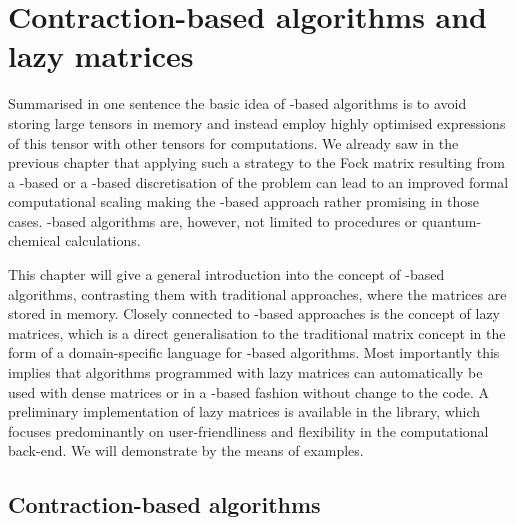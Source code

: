 \chapter{Contraction-based algorithms and lazy matrices}
\label{ch:LazyMatrices}
%
%

\noindent
Summarised in one sentence the basic idea of \contraction-based algorithms
is to avoid storing large tensors in memory
and instead employ highly optimised
\contraction expressions of this tensor with other tensors for computations.
We already saw in the previous chapter that applying
such a strategy to the Fock matrix resulting from a \FE-based
or a \CS-based discretisation of the \HF problem
can lead to an improved formal computational scaling
making the \contraction-based approach rather promising in those cases.
\contraction-based algorithms are, however,
not limited to \SCF procedures or quantum-chemical calculations.

This chapter will give a general introduction into
the concept of \contraction-based algorithms,
contrasting them with traditional approaches,
where the matrices are stored in memory.
Closely connected to \contraction-based approaches is the concept of lazy matrices,
which is a direct generalisation to the traditional matrix concept
in the form of a domain-specific language for \contraction-based algorithms.
Most importantly this implies that algorithms programmed
with lazy matrices can automatically
be used with dense matrices or in a \contraction-based fashion without change to the code.
A preliminary \cpp implementation of lazy matrices
is available in the \lazyten library,
which focuses predominantly on user-friendliness and flexibility
in the computational back-end.
We will demonstrate by the means of examples.


\section{Contraction-based algorithms}
\label{sec:ContractionAlgos}

